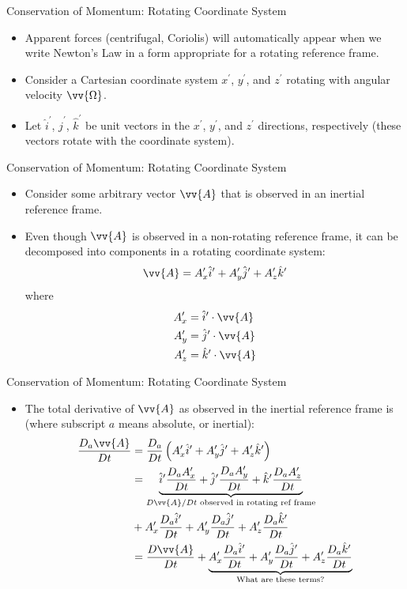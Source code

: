 \begin{frame}{Conservation of Momentum: Rotating Coordinate System}
\begin{itemize}
	\item Apparent forces (centrifugal, Coriolis) will automatically appear when we write Newton's  Law in a form appropriate for a rotating reference frame.
	\item Consider a Cartesian coordinate system $x^\prime$, $y^\prime$, and $z^\prime$ rotating with angular velocity $\vv{\Omega}$. 
	\item Let $\hat i^\prime$, $\hat j^\prime$, $\hat k^\prime$ be unit vectors in the $x^\prime$, $y^\prime$, and $z^\prime$ directions, respectively (these vectors rotate with the coordinate system).
\end{itemize}
\end{frame}
\begin{frame}{Conservation of Momentum: Rotating Coordinate System}
\begin{itemize}
	\item Consider some arbitrary vector $\vv{A}$ that is observed in an inertial reference frame.
	\item Even though $\vv{A}$ is observed in a non-rotating reference frame, it can be decomposed into components in a rotating coordinate system:
	$$\vv{A} = A_x^\prime \hat{i}^\prime + A_y^\prime \hat{j}^\prime + A_z^\prime \hat{k}^\prime$$
	where
	\begin{align*}
		A_x^\prime &= \hat{i}^\prime \cdot \vv{A}\\
		A_y^\prime &= \hat{j}^\prime \cdot \vv{A}\\
		A_z^\prime &= \hat{k}^\prime \cdot \vv{A}
	\end{align*}
\end{itemize}
\end{frame}
\begin{frame}{Conservation of Momentum: Rotating Coordinate System}
\begin{itemize}
	\item The total derivative of $\vv{A}$ as observed in the inertial reference frame is (where subscript $a$ means absolute, or inertial):
	\begin{align*}
	\frac{D_a\vv{A}}{Dt} &= \frac{D_a}{Dt}\left( A_x^\prime \hat{i}^\prime + A_y^\prime \hat{j}^\prime + A_z^\prime \hat{k}^\prime\right)\\
	&= \underbrace{\hat{i}^\prime \frac{D_aA_x^\prime}{Dt} + \hat{j}^\prime \frac{D_aA_y^\prime}{Dt} + \hat{k}^\prime \frac{D_aA_z^\prime}{Dt}}_{\text{$D\vv{A}/Dt$ observed in rotating ref frame}} \\&+ A_x^\prime \frac{D_a \hat{i}^\prime}{Dt} + A_y^\prime \frac{D_a \hat{j}^\prime}{Dt} + A_z^\prime \frac{D_a \hat{k}^\prime}{Dt}\\
	&= \frac{D\vv{A}}{Dt} + \underbrace{A_x^\prime \frac{D_a \hat{i}^\prime}{Dt} + A_y^\prime \frac{D_a \hat{j}^\prime}{Dt} + A_z^\prime \frac{D_a \hat{k}^\prime}{Dt}}_{\text{What are these terms?}}
	\end{align*}
\end{itemize}
\end{frame}

